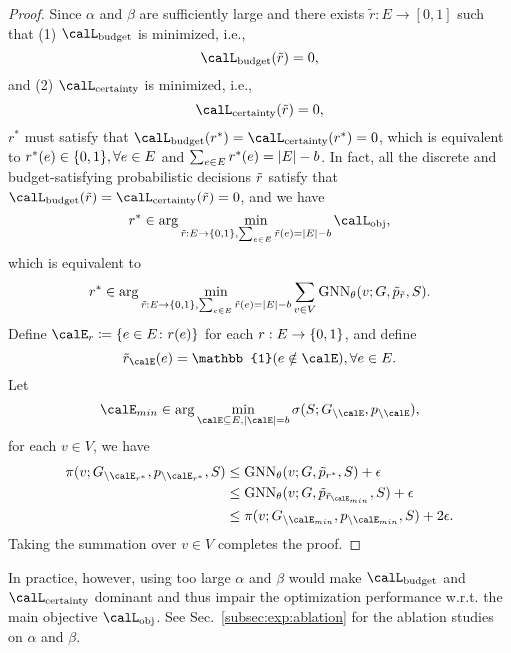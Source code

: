 \begin{proof}
    Since $\alpha$ and $\beta$ are sufficiently large and there exists
    $\tilde{r}: E \to [0, 1]$ such that 
    (1) $\calL_{\text{budget}}$ is minimized, i.e.,
    \[
    \calL_{\text{budget}}(\tilde{r}) = 0,
    \]
    and
    (2) $\calL_{\text{certainty}}$ is minimized, i.e.,
    \[
    \calL_{\text{certainty}}(\tilde{r}) = 0,
    \]
    $r^*$ must satisfy that $\calL_{\text{budget}}(r^*) = \calL_{\text{certainty}}(r^*) = 0$, which is equivalent to $r^*(e) \in \{0, 1\}, \forall e \in E$ and $\sum_{e \in E} r^*(e) = \lvert E \rvert - b$.
    In fact, all the discrete and budget-satisfying probabilistic decisions $\Tilde{r}$ satisfy that     
    $\calL_{\text{budget}}(\Tilde{r}) = \calL_{\text{certainty}}(\Tilde{r}) = 0$,
    and we have 
    \[
    r^* \in \arg \min_{\Tilde{r}: E \to \Set{0, 1}, \sum_{e \in E} \tilde{r}(e) = \Abs{E} - b} \calL_{\text{obj}},
    \]
    which is equivalent to 
    \[
    r^* \in \arg \min_{\Tilde{r}: E \to \{0, 1\}, \sum_{e \in E} \tilde{r}(e) = \lvert E \rvert - b} \sum_{v \in V} \operatorname{GNN}_\theta(v; G, \Tilde{p}_{\Tilde{r}}, S).
    \]    
    Define $\calE_{r} \coloneqq \Set{e \in E \colon r(e)}$ for each $r: E \to \{0, 1\}$, and 
    define
    \[    
    \Tilde{r}_{\calE}(e) = \mathbb{1}(e \notin \calE), \forall e \in E.
    \]
    Let
    \[
    \calE_{min} \in \arg \min_{\calE \subseteq E, \Abs{\calE} = b} \sigma(S; G_{\setminus \calE}, p_{\setminus \calE}),
    \]    
    for each $v \in V$, we have
    \begin{align*}
     \pi(v; G_{\setminus \calE_{r^*}}, p_{\setminus \calE_{r^*}}, S) 
     &\leq \GNN_\theta(v; G, \Tilde{p}_{r^*}, S) + \epsilon \\
     &\leq \GNN_\theta(v; G, \Tilde{p}_{\Tilde{r}_{\calE_{min}}}, S) + \epsilon \\
    & \leq \pi(v; G_{\setminus \calE_{min}}, p_{\setminus \calE_{min}}, S) + 2\epsilon.
    \end{align*}
    Taking the summation over $v \in V$ completes the proof.
\end{proof}

\begin{remark}\label{rem:regularization}
    {In practice, however, using too large $\alpha$ and $\beta$ would make $\calL_{\text{budget}}$ and $\calL_{\text{certainty}}$ dominant and thus impair the optimization performance w.r.t. the main objective $\calL_{\text{obj}}$.
    See Sec.~\ref{subsec:exp:ablation} for the ablation studies on $\alpha$ and $\beta$.} %
\end{remark}



